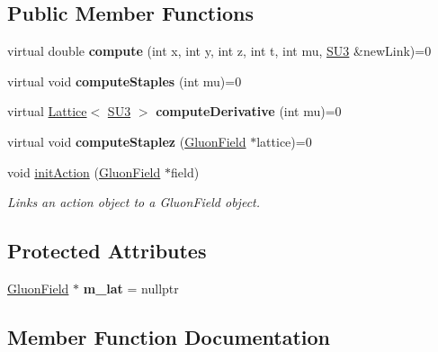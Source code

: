 \subsection*{Public Member Functions}
\begin{DoxyCompactItemize}
\item 
virtual double {\bfseries compute} (int x, int y, int z, int t, int mu, \hyperlink{structSU3}{S\+U3} \&new\+Link)=0\hypertarget{classAction_ac0ea0d66e3ee4c7bdf0b478e613e5981}{}\label{classAction_ac0ea0d66e3ee4c7bdf0b478e613e5981}

\item 
virtual void {\bfseries compute\+Staples} (int mu)=0\hypertarget{classAction_ad6c5003169695d5cba0f69580040db50}{}\label{classAction_ad6c5003169695d5cba0f69580040db50}

\item 
virtual \hyperlink{classLattice}{Lattice}$<$ \hyperlink{structSU3}{S\+U3} $>$ {\bfseries compute\+Derivative} (int mu)=0\hypertarget{classAction_a722e4f88dda82440d0c6e19a43972b21}{}\label{classAction_a722e4f88dda82440d0c6e19a43972b21}

\item 
virtual void {\bfseries compute\+Staplez} (\hyperlink{classField}{Gluon\+Field} $\ast$lattice)=0\hypertarget{classAction_a33f815059f6f3feff70b998d6db58156}{}\label{classAction_a33f815059f6f3feff70b998d6db58156}

\item 
void \hyperlink{classAction_a3c4e7cbcf64ae134fa86afd5d156b12b}{init\+Action} (\hyperlink{classField}{Gluon\+Field} $\ast$field)
\begin{DoxyCompactList}\small\item\em Links an action object to a Gluon\+Field object. \end{DoxyCompactList}\end{DoxyCompactItemize}
\subsection*{Protected Attributes}
\begin{DoxyCompactItemize}
\item 
\hyperlink{classField}{Gluon\+Field} $\ast$ {\bfseries m\+\_\+lat} = nullptr\hypertarget{classAction_adfb7bb92099e0a908efaa4715e75fffd}{}\label{classAction_adfb7bb92099e0a908efaa4715e75fffd}

\end{DoxyCompactItemize}


\subsection{Member Function Documentation}

